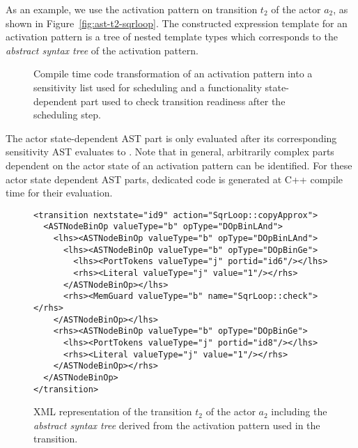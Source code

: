 



As an example, we use the activation pattern on transition $t_2$ of the  actor $a_2$, as shown in Figure~\ref{fig:ast-t2-sqrloop}.
The constructed expression template for an activation pattern is a tree of nested template types which corresponds to the \emph{abstract syntax tree} of the activation pattern.%

\begin{figure}[t]
\centering
\resizebox{\columnwidth}{!}{}
%
\caption{\label{fig:ast-t2-sqrloop}\label{fig:ast-compile-time-transform}%
Compile time code transformation of an activation pattern into a sensitivity list used for scheduling and a functionality state-dependent part used to check transition readiness after the scheduling step.
}
\end{figure}

The actor state-dependent AST part is only evaluated after its corresponding sensitivity AST evaluates to .
Note that in general, arbitrarily complex parts dependent on the actor state of an activation pattern can be identified.
For these actor state dependent AST parts, dedicated code is generated at C++ compile time for their evaluation.

\begin{figure}[t]
\begin{verbatim}
<transition nextstate="id9" action="SqrLoop::copyApprox">
  <ASTNodeBinOp valueType="b" opType="DOpBinLAnd">
    <lhs><ASTNodeBinOp valueType="b" opType="DOpBinLAnd">
      <lhs><ASTNodeBinOp valueType="b" opType="DOpBinGe">
        <lhs><PortTokens valueType="j" portid="id6"/></lhs>
        <rhs><Literal valueType="j" value="1"/></rhs>
      </ASTNodeBinOp></lhs>
      <rhs><MemGuard valueType="b" name="SqrLoop::check"></rhs>
    </ASTNodeBinOp></lhs>
    <rhs><ASTNodeBinOp valueType="b" opType="DOpBinGe">
      <lhs><PortTokens valueType="j" portid="id8"/></lhs>
      <rhs><Literal valueType="j" value="1"/></rhs>
    </ASTNodeBinOp></rhs>
  </ASTNodeBinOp>
</transition>
\end{verbatim}
\caption{\label{fig:xml-t2-sqrloop}%
XML representation of the transition $t_2$ of the  actor $a_2$ including the \emph{abstract syntax tree} derived from the activation pattern used in the transition.
}
\end{figure}

